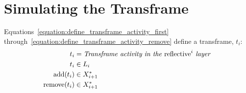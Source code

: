 \section{Simulating the Transframe}

Equations~\ref{equation:define_transframe_activity_first}
through~\ref{equation:define_transframe_activity_remove} define a
transframe, $t_i$:
\begin{align}
\label{equation:define_transframe_activity_first}
                  t_i &= \text{\emph{Transframe activity in the} reflective}^i\text{\emph{ layer}} \\
                  t_i &\in L_i \\
\label{equation:define_transframe_activity_add}
   \text{add}(t_i) &\in X_{i+1}^* \\
\label{equation:define_transframe_activity_remove}
\text{remove}(t_i) &\in X_{i+1}^*
\end{align}

%



